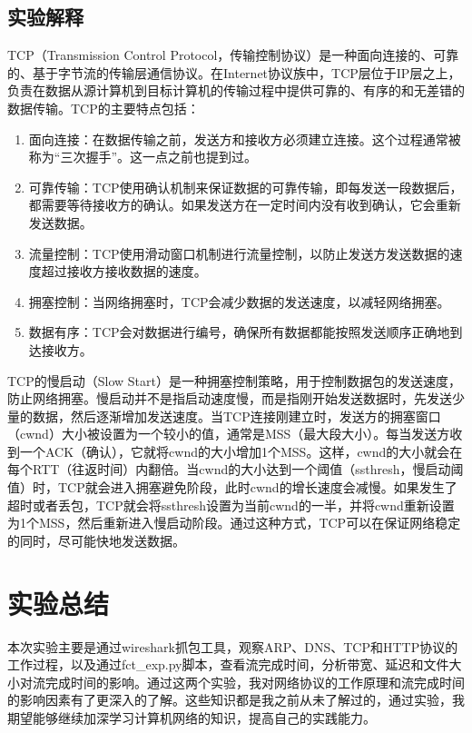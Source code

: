 \documentclass[UTF8]{article}
\begin{document}
\subsection{实验解释}

TCP（Transmission Control Protocol，传输控制协议）是一种面向连接的、可靠的、基于字节流的传输层通信协议。在Internet协议族中，TCP层位于IP层之上，负责在数据从源计算机到目标计算机的传输过程中提供可靠的、有序的和无差错的数据传输。TCP的主要特点包括：
\begin{enumerate}
  \item 面向连接：在数据传输之前，发送方和接收方必须建立连接。这个过程通常被称为“三次握手”。这一点之前也提到过。
  \item 可靠传输：TCP使用确认机制来保证数据的可靠传输，即每发送一段数据后，都需要等待接收方的确认。如果发送方在一定时间内没有收到确认，它会重新发送数据。
  \item 流量控制：TCP使用滑动窗口机制进行流量控制，以防止发送方发送数据的速度超过接收方接收数据的速度。
  \item 拥塞控制：当网络拥塞时，TCP会减少数据的发送速度，以减轻网络拥塞。
  \item 数据有序：TCP会对数据进行编号，确保所有数据都能按照发送顺序正确地到达接收方。
\end{enumerate}

TCP的慢启动（Slow Start）是一种拥塞控制策略，用于控制数据包的发送速度，防止网络拥塞。慢启动并不是指启动速度慢，而是指刚开始发送数据时，先发送少量的数据，然后逐渐增加发送速度。当TCP连接刚建立时，发送方的拥塞窗口（cwnd）大小被设置为一个较小的值，通常是MSS（最大段大小）。每当发送方收到一个ACK（确认），它就将cwnd的大小增加1个MSS。这样，cwnd的大小就会在每个RTT（往返时间）内翻倍。当cwnd的大小达到一个阈值（ssthresh，慢启动阈值）时，TCP就会进入拥塞避免阶段，此时cwnd的增长速度会减慢。如果发生了超时或者丢包，TCP就会将ssthresh设置为当前cwnd的一半，并将cwnd重新设置为1个MSS，然后重新进入慢启动阶段。通过这种方式，TCP可以在保证网络稳定的同时，尽可能快地发送数据。

\section{实验总结}

本次实验主要是通过wireshark抓包工具，观察ARP、DNS、TCP和HTTP协议的工作过程，以及通过fct_exp.py脚本，查看流完成时间，分析带宽、延迟和文件大小对流完成时间的影响。通过这两个实验，我对网络协议的工作原理和流完成时间的影响因素有了更深入的了解。这些知识都是我之前从未了解过的，通过实验，我期望能够继续加深学习计算机网络的知识，提高自己的实践能力。
\end{document}
